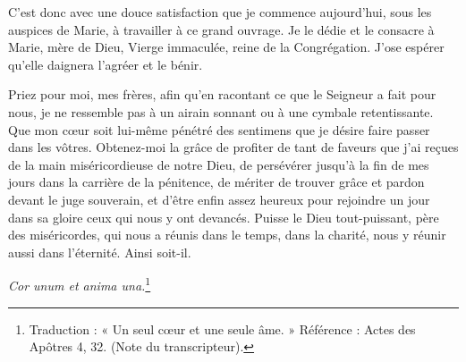 C'est donc avec une douce satisfaction que je commence aujourd'hui, sous les auspices de Marie, à travailler à ce grand ouvrage. Je le dédie et le consacre à Marie, mère de Dieu, Vierge immaculée, reine de la Congrégation. J'ose espérer qu'elle daignera l'agréer et le bénir.

Priez pour moi, mes frères, afin qu'en racontant ce que le Seigneur a fait pour nous, je ne ressemble pas à un airain sonnant ou à une cymbale retentissante. Que mon cœur soit lui-même pénétré des sentimens que je désire faire passer dans les vôtres. Obtenez-moi la grâce de profiter de tant de faveurs que j'ai reçues de la main miséricordieuse de notre Dieu, de persévérer jusqu'à la fin de mes jours dans la carrière de la pénitence, de mériter de trouver grâce et pardon devant le juge souverain, et d'être enfin assez heureux pour rejoindre un jour dans sa gloire ceux qui nous y ont devancés. Puisse le Dieu tout-puissant, père des miséricordes, qui nous a réunis dans le temps, dans la charité, nous y réunir aussi dans l'éternité. Ainsi soit-il.

\begin{center}
\textit{Cor unum et anima una.}\footnote{Traduction : « Un seul cœur et une seule âme. » Référence : Actes des Apôtres 4, 32. (Note du transcripteur).}
\end{center}
